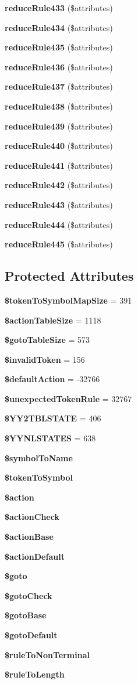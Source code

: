 \begin{DoxyCompactItemize}
{\bf reduce\+Rule433} (\$attributes)
\item 
{\bf reduce\+Rule434} (\$attributes)
\item 
{\bf reduce\+Rule435} (\$attributes)
\item 
{\bf reduce\+Rule436} (\$attributes)
\item 
{\bf reduce\+Rule437} (\$attributes)
\item 
{\bf reduce\+Rule438} (\$attributes)
\item 
{\bf reduce\+Rule439} (\$attributes)
\item 
{\bf reduce\+Rule440} (\$attributes)
\item 
{\bf reduce\+Rule441} (\$attributes)
\item 
{\bf reduce\+Rule442} (\$attributes)
\item 
{\bf reduce\+Rule443} (\$attributes)
\item 
{\bf reduce\+Rule444} (\$attributes)
\item 
{\bf reduce\+Rule445} (\$attributes)
\end{DoxyCompactItemize}
\subsection*{Protected Attributes}
\begin{DoxyCompactItemize}
\item 
{\bf \$token\+To\+Symbol\+Map\+Size} = 391
\item 
{\bf \$action\+Table\+Size} = 1118
\item 
{\bf \$goto\+Table\+Size} = 573
\item 
{\bf \$invalid\+Token} = 156
\item 
{\bf \$default\+Action} = -\/32766
\item 
{\bf \$unexpected\+Token\+Rule} = 32767
\item 
{\bf \$\+Y\+Y2\+T\+B\+L\+S\+T\+A\+T\+E} = 406
\item 
{\bf \$\+Y\+Y\+N\+L\+S\+T\+A\+T\+E\+S} = 638
\item 
{\bf \$symbol\+To\+Name}
\item 
{\bf \$token\+To\+Symbol}
\item 
{\bf \$action}
\item 
{\bf \$action\+Check}
\item 
{\bf \$action\+Base}
\item 
{\bf \$action\+Default}
\item 
{\bf \$goto}
\item 
{\bf \$goto\+Check}
\item 
{\bf \$goto\+Base}
\item 
{\bf \$goto\+Default}
\item 
{\bf \$rule\+To\+Non\+Terminal}
\item 
{\bf \$rule\+To\+Length}
\end{DoxyCompactItemize}

